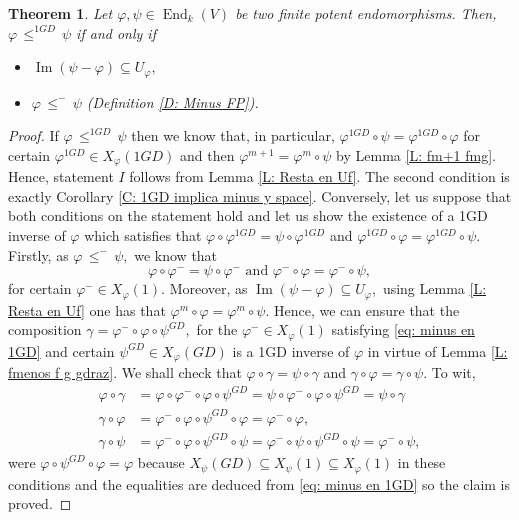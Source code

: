 \documentclass[10pt,a4paper]{amsart}
\newtheorem{thm}[defn]{Theorem}
\theoremstyle{plain}
\theoremstyle{remark}
\numberwithin{equation}{section} \numberwithin{defn}{section}
\newcommand\ed{\operatorname{End}}
\newcommand{\Img}{\operatorname{Im}}
\newcommand{\f}{\varphi}
\newcommand{\g}{\psi}
\begin{document}
\begin{thm}\label{T: 1GD Orden Charact}
Let $\f, \g \in \ed_k(V)$ be two finite potent endomorphisms. Then, $\f \, \leq^{1GD} \, \g$ if and only if \begin{itemize}
\item[I.)]$\Img(\g - \f)\subseteq U_{\f},$
\item[II.)] $\f \, \leq^{-} \, \g$ (Definition \ref{D: Minus FP}).
\end{itemize}
\end{thm}
\begin{proof}
If $\f \, \leq^{1GD} \, \g$ then we know that, in particular, $\f^{1GD}\circ \g =\f^{1GD}\circ \f$ for certain $\f^{1GD}\in X_{\f}(1GD)$ and then $\f^{m+1}=\f^m \circ \g $ by Lemma \ref{L: fm+1 fmg}. Hence, statement $I$ follows from Lemma \ref{L: Resta en Uf}. The second condition is exactly Corollary \ref{C: 1GD implica minus y space}. Conversely, let us suppose that both conditions on the statement hold and let us show the existence of a 1GD inverse of $\f$ which satisfies that $\f \circ \f^{1GD}=\g \circ \f^{1GD}$ and $\f^{1GD}\circ \f=\f^{1GD}\circ \g .$ Firstly, as $\f \, \leq^{-}\, \g,$ we know that 
\begin{equation}\label{eq: minus en 1GD}
\f \circ \f^-=\g\circ \f^- \text{ and } \f^-\circ \f=\f^-\circ \g,
\end{equation} for certain $\f^-\in X_{\f}(1).$
Moreover, as $\Img(\g - \f)\subseteq U_{\f},$ using Lemma \ref{L: Resta en Uf} one has that $\f^m\circ \f = \f^m \circ \g .$ Hence, we can ensure that the composition $\gamma = \f^-\circ \f \circ \g^{GD},$ for the $\f^-\in X_{\f}(1)$ satisfying \eqref{eq: minus en 1GD} and certain $\g^{GD}\in X_{\f}(GD)$ is a 1GD inverse of $\f$ in virtue of Lemma \ref{L: fmenos f g gdraz}. We shall check that $\f \circ \gamma = \g \circ \gamma$ and $\gamma \circ \f = \gamma \circ \g .$
To wit, \begin{align*}
\f \circ \gamma &=\f\circ \f^-\circ \f \circ \g^{GD}=\g \circ \f^-\circ \f \circ \g^{GD}=\g \circ \gamma\\
\gamma \circ \f & =\f^-\circ \f \circ \g^{GD}\circ \f=\f^-\circ \f,\\
\gamma \circ \g & =\f^-\circ \f \circ \g^{GD}\circ \g=\f^-\circ \g \circ \g^{GD}\circ \g=\f^-\circ \g,
\end{align*} were $\f\circ \g^{GD}\circ \f =\f$ because $X_{\g}(GD)\subseteq X_{\g}(1)\subseteq X_{\f}(1)$ in these conditions and the equalities are deduced from \eqref{eq: minus en 1GD} so the claim is proved.
\end{proof}
\end{document}
